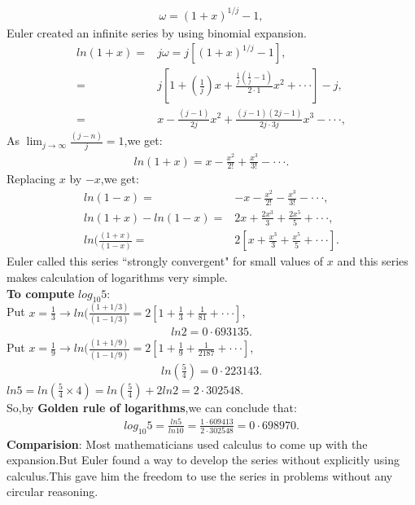 \documentclass[a4paper,reqno,11pt]{book}
\theoremstyle{plain}%
\theoremstyle{definition}
\begin{document}
\begin{eqnarray*}
    \omega=(1+x)^{1/j}-1,
\end{eqnarray*}
Euler created an infinite series by using binomial expansion.
\begin{align*}
ln(1+x)=&j\omega=j[(1+x)^{1/j}-1],\\
=&j\left[1+\left(\frac{1}{j}\right)x+\frac{\frac{1}{j}\left(\frac{1}{j}-1\right)}{2\cdot1}x^2+\cdot\cdot\cdot\right]-j,\\
=&x-\frac{(j-1)}{2j}x^2+\frac{(j-1)(2j-1)}{2j\cdot3j}x^3-\cdot\cdot\cdot,
\end{align*}
As $\lim_{j\to\infty}\frac{(j-n)}{j}=1$,we get:\\
\begin{eqnarray*}
    ln(1+x)=x-\frac{x^2}{2!}+\frac{x^3}{3!}-\cdot\cdot\cdot.
\end{eqnarray*}
Replacing $x$ by $-x$,we get:\\
\begin{align*}
    ln(1-x)=&-x-\frac{x^2}{2!}-\frac{x^3}{3!}-\cdot\cdot\cdot,\\
    ln(1+x)-ln(1-x)=&2x+\frac{2x^3}{3}+\frac{2x^5}{5}+\cdot\cdot\cdot,\\
    ln(\frac{(1+x)}{(1-x)}=&2\left[x+\frac{x^3}{3}+\frac{x^5}{5}+\cdot\cdot\cdot\right].
\end{align*}
Euler called this series ``strongly convergent" for small values of $x$ and this series makes calculation of logarithms very simple.\\

\noindent\textbf{To compute} $log_{10}{5}$:\\

\noindent Put $x=\frac{1}{3}\longrightarrow ln(\frac{(1+1/3)}{(1-1/3)}=2[1+\frac{1}{3}+\frac{1}{81}+\cdot\cdot\cdot]$,\\
\begin{eqnarray*}
    ln2=0\cdot693135.
\end{eqnarray*}
Put $x=\frac{1}{9}\longrightarrow ln(\frac{(1+1/9)}{(1-1/9)}=2[1+\frac{1}{9}+\frac{1}{2187}+\cdot\cdot\cdot]$,\\
\begin{eqnarray*}
    ln(\frac{5}{4})=0\cdot223143.
\end{eqnarray*}
$ln5=ln(\frac{5}{4}\times4)=ln\left(\frac{5}{4}\right)+2ln2=2\cdot302548.$\\

\noindent So,by \textbf{Golden rule of logarithms},we can conclude that:\\
\begin{eqnarray*}
    log_{10}{5}=\frac{ln5}{ln10}=\frac{1\cdot609413}{2\cdot302548}=0\cdot698970.
\end{eqnarray*}
\noindent\textbf{Comparision}: Most mathematicians used calculus to come up with the expansion.But Euler found a way to develop the series without explicitly using calculus.This gave him the freedom to use the series in problems without any circular reasoning.\\
\end{document}
